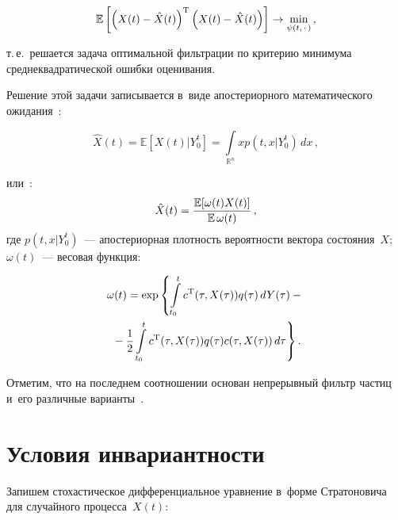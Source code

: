 \begin{multicols}{2}
\vspace*{2pt}

\noindent
$$
  \mathbb{E} \left[ \left( X(t) - \hat X(t) \right)^{{\mathrm{T}}} \left( X(t) - \hat X(t) \right) 
  \right] \rightarrow \min\limits_{\psi(t, \, \cdot \, )}\,,
$$

\vspace*{-2pt}

\noindent
т.\,е.\ решается задача оптимальной фильтрации по критерию минимума 
среднеквадратической ошибки оценивания.

Решение этой задачи записывается в~виде апостериорного математического 
ожидания~\cite{Sin_07}:

\vspace*{2pt}

\noindent
$$
  \hat X(t) = \mathbb{E} \left[ 
  X(t) | Y_0^t \right] = \int\limits_{\mathds{R}^n} x p(t,x|Y_0^t) \,dx\,,
$$


\noindent
или~\cite{BaiCri_09}:
\begin{equation}
\label{eqParticleEstimation}
  \hat X(t) = \displaystyle\frac{\displaystyle \mathbb{E}[\omega(t) X(t)]\mathstrut}{\displaystyle \mathbb{E} \, \omega(t)\mathstrut}\,,
\end{equation}
где $p(t,x|Y_0^t)$~--- апостериорная плот\-ность ве\-ро\-ят\-ности вектора состояния~$X$; 
$\omega(t)$~--- весовая функция:

\vspace*{-4pt}

\noindent
\begin{multline*}
  \omega(t) = \exp \left\{ \int\limits_{t_0}^t c^{{\mathrm{T}}}(\tau,X(\tau)) 
  q(\tau) \,dY(\tau) -{}\right.\\
\left.  {}- \displaystyle\frac{\displaystyle 1\mathstrut}{\displaystyle 2\mathstrut} \int\limits_{t_0}^t c^{{\mathrm{T}}}(\tau,X(\tau)) 
  q(\tau) c(\tau,X(\tau)) \,d\tau \right\}.
\end{multline*}

Отметим, что на последнем соотношении основан непрерывный фильтр 
частиц и~его различные варианты~\cite{BaiCri_09, Ryb_17}.

\vspace*{-4pt}

\section{Условия инвариантности}

Запишем стохастическое дифференциальное уравнение в~форме 
Стратоновича для случайного процесса~$X(t)$:

\vspace*{-2pt}


\end{multicols}
